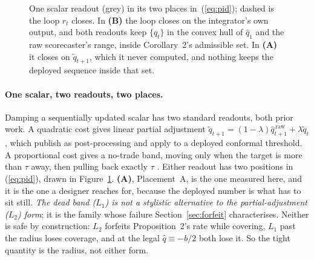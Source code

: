 \begin{figure}[t]
\caption{One scalar readout (grey) in its two places in~(\ref{eq:pid}); dashed is the loop $r_t$ closes. In \textbf{(B)} the loop closes on the integrator's own output, and both readouts keep $\{\hat q_t\}$ in the convex hull of $\hat q_1$ and the raw scorecaster's range, inside Corollary~2's admissible set. In \textbf{(A)} it closes on $\tilde q_{t+1}$, which it never computed, and nothing keeps the deployed sequence inside that set.}
\label{fig:placements}
\vspace{-4pt}
\end{figure}

\paragraph{One scalar, two readouts, two places.} Damping a sequentially updated scalar
has two standard readouts, both prior work. A quadratic cost gives linear partial adjustment
$\tilde{q}_{t+1} = (1-\lambda)\hat{q}^{\,\mathrm{raw}}_{t+1} +
\lambda\tilde{q}_t$ \citep{garleanu2013dynamic}, which \citet{godahewa2025stability} publish as
post-processing and \citet[Eq.~13]{binny2025whomoved} apply to a deployed conformal threshold. A
proportional cost gives a no-trade band, moving only when the
target is more than $\tau$ away, then pulling back exactly $\tau$
\citep{constantinides1986,davis1990}. Either readout has two positions in (\ref{eq:pid}), drawn
in Figure~\ref{fig:placements}. \textbf{(A)}, Placement~A, is the one measured here, and it is
the one a designer reaches for, because the deployed number is what has to sit still.
\emph{The dead band ($L_1$) is not a stylistic alternative to the partial-adjustment ($L_2$) form}; it
is the family whose failure Section~\ref{sec:forfeit} characterises. Neither is safe by construction:
$L_2$ forfeits Proposition~2's
rate while covering, $L_1$ past the radius loses coverage, and at the legal $\hat{q} \equiv
-b/2$ both lose it. So the tight quantity is the radius, not either form.

